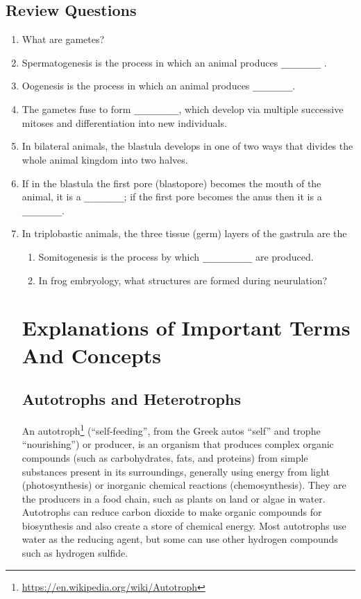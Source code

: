 \documentclass[]{book}
\let\rmarkdownfootnote\footnote%
\def\footnote{\protect\rmarkdownfootnote}
\renewcommand{\href}[2]{#2\footnote{\url{#1}}}
\theoremstyle{definition}
\theoremstyle{definition}
\theoremstyle{definition}
\theoremstyle{remark}
\begin{document}
\section{Review Questions}\label{review-questions-10}

\begin{enumerate}
\def\labelenumi{\arabic{enumi}.}
\item
  What are gametes?
\item
  Spermatogenesis is the process in which an animal produces
  \texttt{\_\_\_\_\_\_\_\_} .
\item
  Oogenesis is the process in which an animal produces
  \texttt{\_\_\_\_\_\_\_\_}.
\item
  The gametes fuse to form \texttt{\_\_\_\_\_\_\_\_\_}, which develop
  via multiple successive mitoses and differentiation into new
  individuals.
\item
  In bilateral animals, the blastula develops in one of two ways that
  divides the whole animal kingdom into two halves.
\item
  If in the blastula the first pore (blastopore) becomes the mouth of
  the animal, it is a \texttt{\_\_\_\_\_\_\_\_}; if the first pore
  becomes the anus then it is a \texttt{\_\_\_\_\_\_\_\_}.
\item
  In triplobastic animals, the three tissue (germ) layers of the
  gastrula are the
\begin{enumerate}
\def\labelenumi{\arabic{enumi}.}
\item
  Somitogenesis is the process by which \texttt{\_\_\_\_\_\_\_\_\_\_}
  are produced.
\item
  In frog embryology, what structures are formed during neurulation?
\end{enumerate}

\appendix


\chapter{Explanations of Important Terms And
Concepts}\label{explanations-of-important-terms-and-concepts}

\section{Autotrophs and Heterotrophs}\label{autotrophs-and-heterotrophs}

An \href{https://en.wikipedia.org/wiki/Autotroph}{autotroph}
(``self-feeding'', from the Greek autos ``self'' and trophe
``nourishing'') or producer, is an organism that produces complex
organic compounds (such as carbohydrates, fats, and proteins) from
simple substances present in its surroundings, generally using energy
from light (photosynthesis) or inorganic chemical reactions
(chemosynthesis). They are the producers in a food chain, such as plants
on land or algae in water. Autotrophs can reduce carbon dioxide to make
organic compounds for biosynthesis and also create a store of chemical
energy. Most autotrophs use water as the reducing agent, but some can
use other hydrogen compounds such as hydrogen sulfide.


\end{enumerate}
\end{document}

